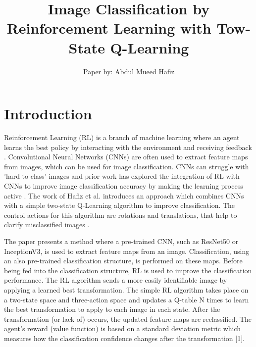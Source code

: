 \documentclass[10pt,twocolumn,letterpaper]{article}
\begin{document}
\title{Image Classification by Reinforcement Learning with Tow-State Q-Learning\cite{hafizImageClassificationReinforcement2022}}
\author{Paper by: Abdul Mueed Hafiz}

\maketitle



\begin{abstract}
\end{abstract}
\thispagestyle{title}

\section{Introduction}\label{sec:intro}
Reinforcement Learning (RL) is a branch of machine learning where an agent learns the best policy by interacting with the environment and receiving feedback \cite{suttonReinforcementLearningIntroduction1992}. Convolutional Neural Networks (CNNs) are often used to extract feature maps from images, which can be used for image classification. CNNs can struggle with 'hard to class' images and prior work has explored the integration of RL with CNNs to improve image classification accuracy by making the learning process active \cite{leDeepReinforcementLearning2022}. The work of Hafiz et al. introduces an approach which combines CNNs with a simple two-state Q-Learning algorithm to improve classification. The control actions for this algorithm are rotations and translations, that help to clarify misclassified images \cite{hafizImageClassificationReinforcement2022}. 

The paper presents a method where a pre-trained CNN, such as ResNet50 or InceptionV3, is used to extract feature maps from an image. Classification, using an also pre-trained classification structure, is performed on these maps. Before being fed into the classification structure, RL is used to improve the classification performance. The RL algorithm sends a more easily identifiable image by applying a learned best transformation. The simple RL algorithm takes place on a two-state space and three-action space and updates a Q-table N times to learn the best transformation to apply to each image in each state. After the transformation (or lack of) occurs, the updated feature maps are reclassified. The agent's reward (value function) is based on a standard deviation metric which measures how the classification confidence changes after the transformation [1].
\end{document}
